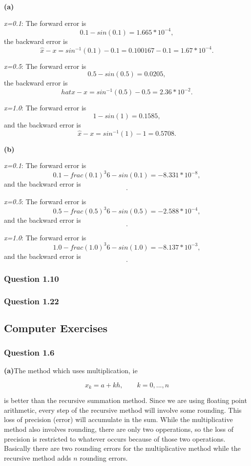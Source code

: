 \documentclass{article}
\begin{document}
\textbf{(a)}

\textit{x=0.1}: The forward error is $$0.1 - sin(0.1) = 1.665*10^{-4},$$
the backward error is $$\hat{x} -x = sin^{-1}(0.1) -0.1 = 0.100167 - 0.1 = 1.67*10^{-4}.$$


\textit{x=0.5}: The forward error is $$0.5 - sin(0.5) = 0.0205,$$ the backward error is
$$hat{x} -x = sin^{-1}(0.5) - 0.5 = 2.36 * 10^{-2}.$$


\textit{x=1.0}: The forward error is $$1 - sin(1) = 0.1585,$$ and the backward error is $$\hat{x}-x=sin^{-1}(1) - 1 = 0.5708.$$

\textbf{(b)}

\textit{x=0.1}: The forward error is $$0.1-frac{(0.1)^{3}}{6} - sin(0.1)= -8.331*10^{-8},$$ and the backward error is $$.$$

\textit{x=0.5}: The forward error is $$0.5-frac{(0.5)^{3}}{6} - sin(0.5)= -2.588*10^{-4},$$  and the backward error is $$.$$

\textit{x=1.0}: The forward error is $$1.0-frac{(1.0)^{3}}{6}- sin(1.0) = -8.137*10^{-3},$$ and the backward error is $$.$$

\subsubsection{Question 1.10}

\subsubsection{Question 1.22}

\subsection{Computer Exercises}
\subsubsection{Question 1.6}

\textbf{(a)}The method which uses multiplication, ie

$$x_k = a + kh, \qquad k=0,...,n$$

is better than the recursive summation method. Since we are using floating point arithmetic, every step of the recursive method will involve some rounding. This loss of precision (error) will accumulate in the sum. While the multiplicative method also involves rounding, there are only two opperations, so the loss of precision is restricted to whatever occurs because of those two operations. Basically there are two rounding errors for the multiplicative method while the recursive method adds $n$ rounding errors.
\end{document}
